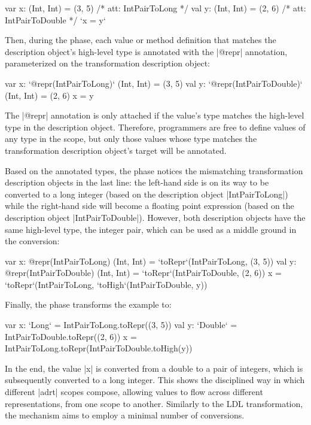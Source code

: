 \begin{lstlisting-nobreak}
var x: (Int, Int) = (3, 5) /* att: IntPairToLong */
val y: (Int, Int) = (2, 6) /* att: IntPairToDouble */
`x = y`
\end{lstlisting-nobreak}

Then, during the \inject{} phase, each value or method definition that matches the description object's high-level type is annotated with the |@repr| annotation, parameterized on the transformation description object:

\begin{lstlisting-nobreak}
var x: `@repr(IntPairToLong)` (Int, Int) = (3, 5)
val y: `@repr(IntPairToDouble)` (Int, Int) = (2, 6)
x = y
\end{lstlisting-nobreak}

The |@repr| annotation is only attached if the value's type matches the high-level type in the description object. Therefore, programmers are free to define values of any type in the scope, but only those values whose type matches the transformation description object's target will be annotated.

Based on the annotated types, the \coerce{} phase notices the mismatching transformation description objects in the last line: the left-hand side is on its way to be converted to a long integer (based on the description object |IntPairToLong|) while the right-hand side will become a floating point expression (based on the description object |IntPairToDouble|). However, both description objects have the same high-level type, the integer pair, which can be used as a middle ground in the conversion:

\begin{lstlisting-nobreak}
var x: @repr(IntPairToLong) (Int, Int) = `toRepr`(IntPairToLong, (3, 5))
val y: @repr(IntPairToDouble) (Int, Int) = `toRepr`(IntPairToDouble, (2, 6))
x = `toRepr`(IntPairToLong, `toHigh`(IntPairToDouble, y))
\end{lstlisting-nobreak}

Finally, the \commit{} phase transforms the example to:

\begin{lstlisting-nobreak}
var x: `Long` = IntPairToLong.toRepr((3, 5))
val y: `Double` = IntPairToDouble.toRepr((2, 6))
x = IntPairToLong.toRepr(IntPairToDouble.toHigh(y))
\end{lstlisting-nobreak}

In the end, the value |x| is converted from a double to a pair of integers, which is subsequently converted to a long integer. This shows the disciplined way in which different |adrt| scopes compose, allowing values to flow across different representations, from one scope to another. Similarly to the LDL transformation, the mechanism aims to employ a minimal number of conversions.

